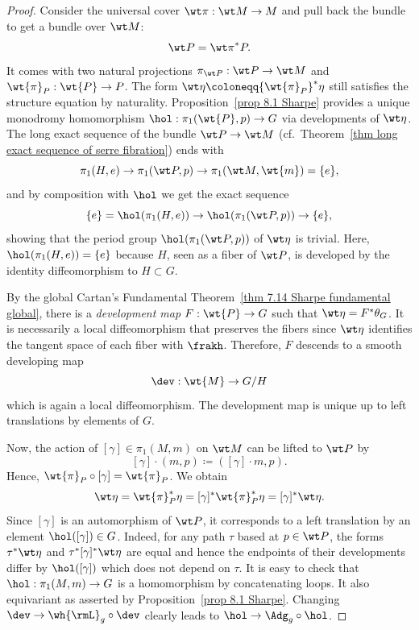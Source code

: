 \begin{proof}
    Consider the universal cover $\wt\pi:\wt M\to M$ and pull back the bundle to get a bundle over $\wt M$:
    \[\wt P={\wt\pi}^\ast P.\]
    It comes with two natural projections $\pi_{\wt P}:\wt P\to \wt M$ and $\wt{\pi}_P:\wt{P}\to P$. The form $\wt\eta\coloneqq {\wt{\pi}_P}^\ast\eta$ still satisfies the structure equation by naturality. Proposition~\ref{prop 8.1 Sharpe} provides a unique monodromy homomorphism $\hol:\pi_1(\wt{P},p)\to G$ via developments of $\wt\eta$. The long exact sequence of the bundle $\wt P\to \wt M$ (cf.\ Theorem~\ref{thm long exact sequence of serre fibration}) ends with
    \[\pi_1(H,e)\to \pi_1(\wt P,p)\to \pi_1(\wt M,\wt{m})=\{e\},\]
    and by composition with $\hol$ we get the exact sequence 
    \[\{e\}=\hol(\pi_1(H,e))\to \hol(\pi_1(\wt P,p))\to \{e\},\]
    showing that the period group $\hol(\pi_1(\wt P,p))$ of $\wt\eta$ is trivial. Here, $\hol(\pi_1(H,e))=\{e\}$ because $H$, seen as a fiber of $\wt P$, is developed by the identity diffeomorphism to $H\subset G$.

    By the global Cartan's Fundamental Theorem~\ref{thm 7.14 Sharpe fundamental global}, there is a \emph{development map} $F:\wt{P}\to G$ such that $\wt\eta=F^\ast\theta_G$. It is necessarily a local diffeomorphism that preserves the fibers since $\wt\eta$ identifies the tangent space of each fiber with $\frakh$. Therefore, $F$ descends to a smooth developing map 
    \[\dev:\wt{M}\to G\slash H\]
    which is again a local diffeomorphism. The development map is unique up to left translations by elements of $G$.

    Now, the action of $[\gamma]\in \pi_1(M,m)$ on $\wt M$ can be lifted to $\wt P$ by
    \[[\gamma]\cdot (m,p)\coloneqq ([\gamma]\cdot m,p).\]
    Hence, $\wt{\pi}_P\circ [\gamma]=\wt{\pi}_P$. We obtain
    \[\wt\eta=\wt{\pi}_P^\ast \eta=[\gamma]^\ast \wt{\pi}_P^\ast \eta=[\gamma]^\ast\wt\eta.\]
    Since $[\gamma]$ is an automorphism of $\wt P$, it corresponds to a left translation by an element $\hol([\gamma])\in G$. Indeed, for any path $\tau$ based at $p\in\wt P$, the forms $\tau^\ast\wt\eta$ and $\tau^\ast[\gamma]^\ast\wt\eta$ are equal and hence the endpoints of their developments differ by $\hol([\gamma])$ which does not depend on $\tau$. It is easy to check that $\hol:\pi_1(M,m)\to G$ is a homomorphism by concatenating loops. It also equivariant as asserted by Proposition~\ref{prop 8.1 Sharpe}. Changing $\dev\to \wh{\rmL}_g\circ \dev$ clearly leads to $\hol\to \Adg_g\circ\hol$.


\end{proof}
